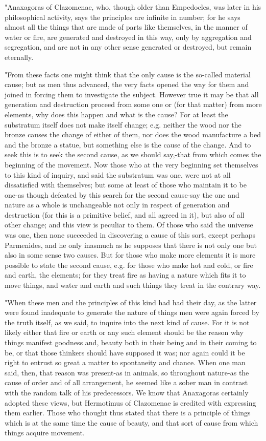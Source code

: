 "Anaxagoras of Clazomenae, who, though older than Empedocles, was
later in his philosophical activity, says the principles are infinite
in number; for he says almost all the things that are made of parts
like themselves, in the manner of water or fire, are generated and
destroyed in this way, only by aggregation and segregation, and are
not in any other sense generated or destroyed, but remain eternally.

"From these facts one might think that the only cause is the so-called
material cause; but as men thus advanced, the very facts opened the
way for them and joined in forcing them to investigate the subject.
However true it may be that all generation and destruction proceed
from some one or (for that matter) from more elements, why does this
happen and what is the cause? For at least the substratum itself does
not make itself change; e.g. neither the wood nor the bronze causes
the change of either of them, nor does the wood manufacture a bed
and the bronze a statue, but something else is the cause of the change.
And to seek this is to seek the second cause, as we should say,-that
from which comes the beginning of the movement. Now those who at the
very beginning set themselves to this kind of inquiry, and said the
substratum was one, were not at all dissatisfied with themselves;
but some at least of those who maintain it to be one-as though defeated
by this search for the second cause-say the one and nature as a whole
is unchangeable not only in respect of generation and destruction
(for this is a primitive belief, and all agreed in it), but also of
all other change; and this view is peculiar to them. Of those who
said the universe was one, then none succeeded in discovering a cause
of this sort, except perhaps Parmenides, and he only inasmuch as he
supposes that there is not only one but also in some sense two causes.
But for those who make more elements it is more possible to state
the second cause, e.g. for those who make hot and cold, or fire and
earth, the elements; for they treat fire as having a nature which
fits it to move things, and water and earth and such things they treat
in the contrary way. 

"When these men and the principles of this kind had had their day,
as the latter were found inadequate to generate the nature of things
men were again forced by the truth itself, as we said, to inquire
into the next kind of cause. For it is not likely either that fire
or earth or any such element should be the reason why things manifest
goodness and, beauty both in their being and in their coming to be,
or that those thinkers should have supposed it was; nor again could
it be right to entrust so great a matter to spontaneity and chance.
When one man said, then, that reason was present-as in animals, so
throughout nature-as the cause of order and of all arrangement, he
seemed like a sober man in contrast with the random talk of his predecessors.
We know that Anaxagoras certainly adopted these views, but Hermotimus
of Clazomenae is credited with expressing them earlier. Those who
thought thus stated that there is a principle of things which is at
the same time the cause of beauty, and that sort of cause from which
things acquire movement. 

